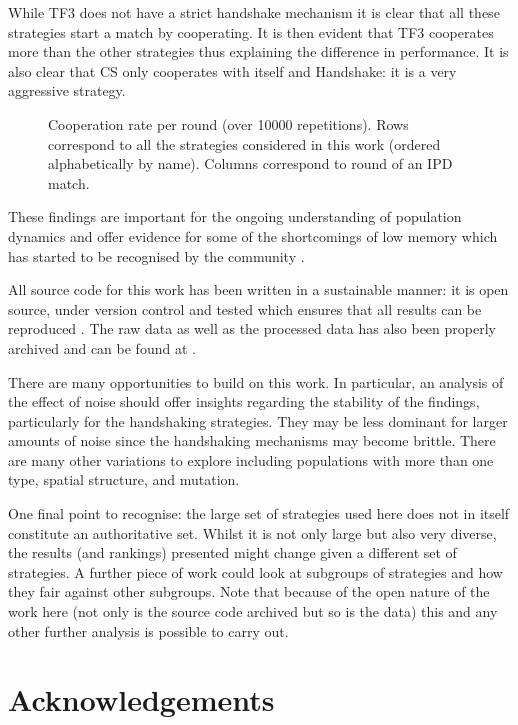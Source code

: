 \documentclass[10pt,letterpaper]{article}
\begin{document}
While TF3
does not have a strict handshake mechanism it is clear that all these strategies
start a match by cooperating. It is then evident that TF3 cooperates more than
the other strategies thus explaining the difference in performance. It is also
clear that CS only cooperates with itself and Handshake: it is a very aggressive
strategy.

\begin{figure}[!hbtp]
    \centering
    \caption{Cooperation rate per round (over 10000 repetitions). Rows
        correspond to all the strategies considered in this work (ordered
    alphabetically by name). Columns correspond to round of an IPD match.}
    \label{fig:cooperation_rates}
\end{figure}

These findings are important for the ongoing understanding of
population dynamics and offer evidence for some of the shortcomings of low
memory which has started to be recognised by the community \cite{Hilbe2017}.

All source code for this work has been written in a sustainable manner: it is
open source, under version control and tested which ensures that all results can
be reproduced \cite{Prlic2012, Sandve2013, Wilson2014}. The raw data as well as
the processed data has also been properly archived and can be found
at \cite{data}.

There are many opportunities to build on this work. In particular, an analysis
of the effect of noise should offer insights regarding the stability of the findings,
particularly for the handshaking strategies. They may be less dominant for
larger amounts of noise since the handshaking mechanisms may become brittle.
There are many other variations to explore including populations with more
than one type, spatial structure, and mutation.

One final point to recognise: the large set of strategies used here does not in
itself constitute an authoritative set. Whilst it is not only large but also very
diverse, the results (and rankings) presented might change given a different set
of strategies. A further piece of work could look at subgroups of strategies and
how they fair against other subgroups. Note that because of the open nature of
the work here (not only is the source code archived but so is the data) this and
any other further analysis is possible to carry out.


\section*{Acknowledgements}
\end{document}
